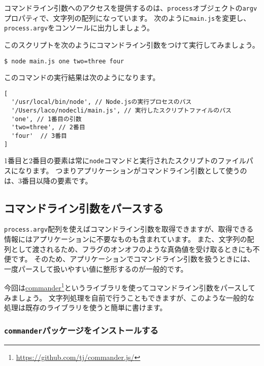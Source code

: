 コマンドライン引数へのアクセスを提供するのは、\texttt{process}オブジェクトの\texttt{argv}プロパティで、文字列の配列になっています。
次のように\texttt{main.js}を変更し、\texttt{process.argv}をコンソールに出力しましょう。



このスクリプトを次のようにコマンドライン引数をつけて実行してみましょう。

\begin{lstlisting}
$ node main.js one two=three four
\end{lstlisting}

このコマンドの実行結果は次のようになります。

\begin{lstlisting}
[ 
  '/usr/local/bin/node', // Node.jsの実行プロセスのパス
  '/Users/laco/nodecli/main.js', // 実行したスクリプトファイルのパス
  'one', // 1番目の引数
  'two=three', // 2番目
  'four'  // 3番目
]
\end{lstlisting}

1番目と2番目の要素は常に\texttt{node}コマンドと実行されたスクリプトのファイルパスになります。
つまりアプリケーションがコマンドライン引数として使うのは、3番目以降の要素です。

\hypertarget{parse-args}{%
\subsection{コマンドライン引数をパースする}\label{parse-args}}

\texttt{process.argv}配列を使えばコマンドライン引数を取得できますが、取得できる情報にはアプリケーションに不要なものも含まれています。
また、文字列の配列として渡されるため、フラグのオンオフのような真偽値を受け取るときにも不便です。
そのため、アプリケーションでコマンドライン引数を扱うときには、一度パースして扱いやすい値に整形するのが一般的です。

今回は\href{https://github.com/tj/commander.js/}{commander}\footnote{\url{https://github.com/tj/commander.js/}}というライブラリを使ってコマンドライン引数をパースしてみましょう。
文字列処理を自前で行うこともできますが、このような一般的な処理は既存のライブラリを使うと簡単に書けます。

\hypertarget{install-commander}{%
\subsubsection{\texorpdfstring{\texttt{commander}パッケージをインストールする}{commanderパッケージをインストールする}}\label{install-commander}}

